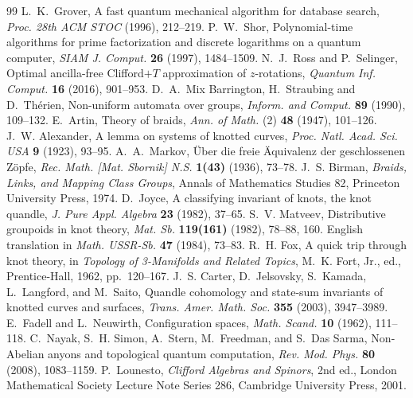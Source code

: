 \documentclass[11pt,reqno]{amsart}
\theoremstyle{definition}
\theoremstyle{remark}
\numberwithin{equation}{section}
\begin{document}
\begin{thebibliography}{99}
 L.~K.~Grover, A fast quantum mechanical algorithm for database search, \emph{Proc. 28th ACM STOC} (1996), 212--219.
 P.~W.~Shor, Polynomial-time algorithms for prime factorization and discrete logarithms on a quantum computer, \emph{SIAM J. Comput.} \textbf{26} (1997), 1484--1509.
 N.~J.~Ross and P.~Selinger, Optimal ancilla-free Clifford$+T$ approximation of $z$-rotations, \emph{Quantum Inf. Comput.} \textbf{16} (2016), 901--953.
 D.~A.~Mix Barrington, H.~Straubing and D.~Th\'erien, Non-uniform automata over groups, \emph{Inform. and Comput.} \textbf{89} (1990), 109--132.
 E.~Artin, Theory of braids, \emph{Ann. of Math.} (2) \textbf{48} (1947), 101--126.
 J.~W. Alexander, A lemma on systems of knotted curves, \emph{Proc. Natl. Acad. Sci. USA} \textbf{9} (1923), 93--95.
 A.~A.~Markov, \"Uber die freie \"Aquivalenz der geschlossenen Z\"opfe, \emph{Rec. Math. [Mat. Sbornik] N.S.} \textbf{1(43)} (1936), 73--78.
 J.~S. Birman, \emph{Braids, Links, and Mapping Class Groups}, Annals of Mathematics Studies 82, Princeton University Press, 1974.
 D.~Joyce, A classifying invariant of knots, the knot quandle, \emph{J. Pure Appl. Algebra} \textbf{23} (1982), 37--65.
 S.~V. Matveev, Distributive groupoids in knot theory, \emph{Mat. Sb.} \textbf{119(161)} (1982), 78--88, 160. English translation in \emph{Math. USSR-Sb.} \textbf{47} (1984), 73--83.
 R.~H. Fox, A quick trip through knot theory, in \emph{Topology of 3-Manifolds and Related Topics}, M.~K. Fort, Jr., ed., Prentice-Hall, 1962, pp.~120--167.
 J.~S. Carter, D.~Jelsovsky, S.~Kamada, L.~Langford, and M.~Saito, Quandle cohomology and state-sum invariants of knotted curves and surfaces, \emph{Trans. Amer. Math. Soc.} \textbf{355} (2003), 3947--3989.
 E.~Fadell and L.~Neuwirth, Configuration spaces, \emph{Math. Scand.} \textbf{10} (1962), 111--118.
 C.~Nayak, S.~H. Simon, A.~Stern, M.~Freedman, and S.~Das Sarma, Non-Abelian anyons and topological quantum computation, \emph{Rev. Mod. Phys.} \textbf{80} (2008), 1083--1159.
 P.~Lounesto, \emph{Clifford Algebras and Spinors}, 2nd ed., London Mathematical Society Lecture Note Series 286, Cambridge University Press, 2001.

\end{thebibliography}
\end{document}
